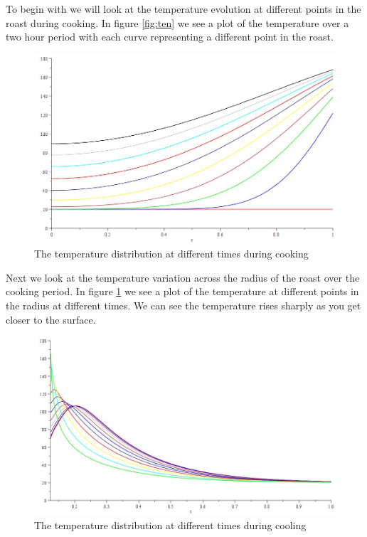 \documentclass{report}
\begin{document}
To begin with we will look at the temperature evolution at different points in the roast during cooking. In figure 
\ref{fig:ten} we see a plot of the temperature over a two hour period with each curve representing a different point in 
the roast.\bigskip

\begin{figure}[h]
\centering
\includegraphics[scale = 0.15]{temperature-distribution-in-radius-numeric}
\caption{The temperature distribution at different times during cooking}
\label{fig:tdn}
\end{figure}

Next we look at the temperature variation across the radius 
of the roast over the cooking period. In figure \ref{fig:tdn} we see a plot of the temperature at different points in the 
radius at different times. We can see the temperature rises sharply as you get closer to the surface.\bigskip

\begin{figure}[h]
\centering
\includegraphics[scale = 0.15]{temperature-distribution-in-radius-cooling-numeric}
\caption{The temperature distribution at different times during cooling}
\label{fig:tdcn}
\end{figure}
\end{document}
